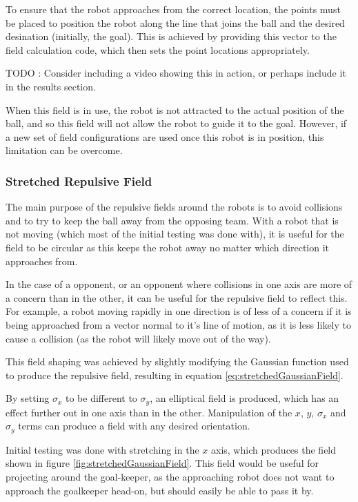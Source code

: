 \documentclass[10pt]{article} \usepackage[a4paper]{geometry}
\begin{document}
To ensure that the robot approaches from the correct location, the points must
be placed to position the robot along the line that joins the ball and the
desired desination (initially, the goal).  This is achieved by providing this
vector to the field calculation code, which then sets the point locations
appropriately.

TODO : Consider including a video showing this in action, or perhaps include it
in the results section.

When this field is in use, the robot is not attracted to the actual position of
the ball, and so this field will not allow the robot to guide it to the goal.
However, if a new set of field configurations are used once this robot is in
position, this limitation can be overcome.

\subsubsection{Stretched Repulsive Field}

The main purpose of the repulsive fields around the robots is to avoid
collisions and to try to keep the ball away from the opposing team.  With a
robot that is not moving (which most of the initial testing was done with), it
is useful for the field to be circular as this keeps the robot away no matter
which direction it approaches from.

In the case of a opponent, or an opponent where collisions in one axis are
more of a concern than in the other, it can be useful for the repulsive field to
reflect this.  For example, a robot moving rapidly in one direction is of less
of a concern if it is being approached from a vector normal to it's line of
motion, as it is less likely to cause a collision (as the robot will likely move
out of the way).

This field shaping was achieved by slightly modifying the Gaussian function used
to produce the repulsive field, resulting in equation
\ref{eq:stretchedGaussianField}.  

By setting $\sigma_x$ to be different to $\sigma_y$, an elliptical field  is
produced, which has an effect further out in one axis than in the other. 
Manipulation of the $x$, $y$, $\sigma_x$ and $\sigma_y$ terms can produce a
field with any desired orientation.

Initial testing was done with stretching in the $x$ axis, which produces the
field shown in figure \ref{fig:stretchedGaussianField}.  This field would be
useful for projecting around the goal-keeper, as the approaching robot does not
want to approach the goalkeeper head-on, but should easily be able to pass it
by.
\end{document}
